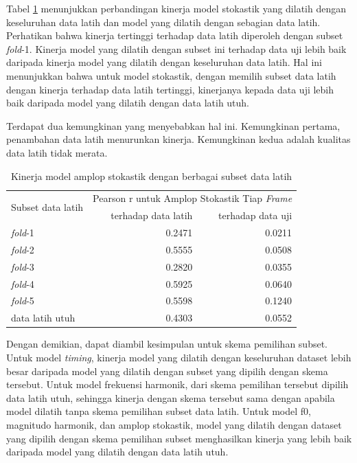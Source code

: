 Tabel \ref{tab-stoc-model-subset-results} menunjukkan perbandingan kinerja model stokastik yang dilatih dengan keseluruhan data latih dan model yang dilatih dengan sebagian data latih. Perhatikan bahwa kinerja tertinggi terhadap data latih diperoleh dengan subset \textit{fold}-1. Kinerja model yang dilatih dengan subset ini terhadap data uji lebih baik daripada kinerja model yang dilatih dengan keseluruhan data latih. Hal ini menunjukkan bahwa untuk model stokastik, dengan memilih subset data latih dengan kinerja terhadap data latih tertinggi, kinerjanya kepada data uji lebih baik daripada model yang dilatih dengan data latih utuh. 

Terdapat dua kemungkinan yang menyebabkan hal ini. Kemungkinan pertama, penambahan data latih menurunkan kinerja. Kemungkinan kedua adalah kualitas data latih tidak merata.

\begin{table}[htbp]
    \centering
    \caption{Kinerja model amplop stokastik dengan berbagai subset data latih}\label{tab-stoc-model-subset-results}
    \begin{tabular}{ |l|r|r| } 
     \hline
     \multirow{2}{*}{Subset data latih} & \multicolumn{2}{l|}{Pearson r untuk Amplop Stokastik Tiap \textit{Frame}} \\
     \cline{2-3}
     & terhadap data latih & terhadap data uji \\\hline
	\textit{fold}-1       &0.2471  &0.0211\\\hline
	\textit{fold}-2       &0.5555  &0.0508\\\hline
	\textit{fold}-3       &0.2820  &0.0355\\\hline
	\textit{fold}-4       &0.5925  &0.0640\\\hline
	\textit{fold}-5       &0.5598  &0.1240\\\hline
	data latih utuh       &0.4303  &0.0552\\\hline
    \end{tabular}
\end{table}

Dengan demikian, dapat diambil kesimpulan untuk skema pemilihan subset. Untuk model \textit{timing}, kinerja model yang dilatih dengan keseluruhan dataset lebih besar daripada model yang dilatih dengan subset yang dipilih dengan skema tersebut. Untuk model frekuensi harmonik, dari skema pemilihan tersebut dipilih data latih utuh, sehingga kinerja dengan skema tersebut sama dengan apabila model dilatih tanpa skema pemilihan subset data latih. Untuk model f0, magnitudo harmonik, dan amplop stokastik, model yang dilatih dengan dataset yang dipilih dengan skema pemilihan subset menghasilkan kinerja yang lebih baik daripada model yang dilatih dengan data latih utuh.


